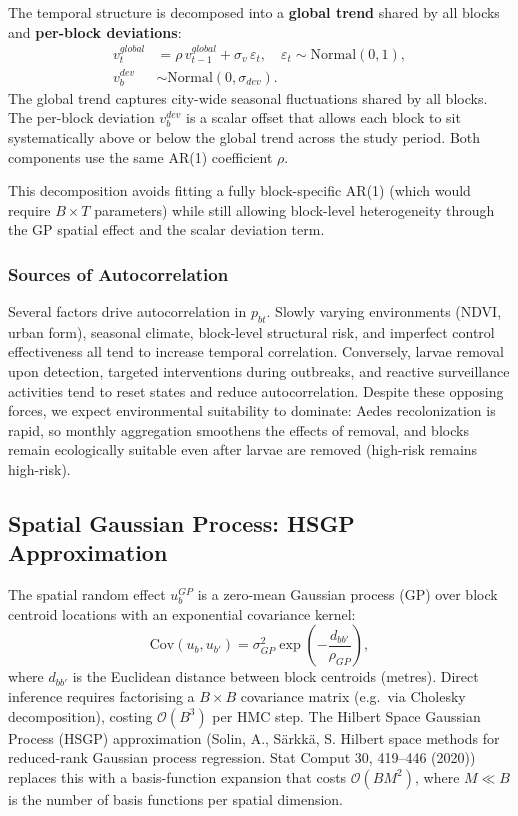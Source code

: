 \documentclass[12pt,a4paper]{article}
\begin{document}
The temporal structure is decomposed into a \textbf{global trend} shared by all blocks and \textbf{per-block deviations}:
\begin{align}
v_t^{global} &= \rho\, v_{t-1}^{global} + \sigma_v\, \varepsilon_t, \quad \varepsilon_t \sim \text{Normal}(0,1), \\
v_b^{dev} &\sim \text{Normal}(0, \sigma_{dev}).
\end{align}
The global trend captures city-wide seasonal fluctuations shared by all blocks. The per-block deviation $v_b^{dev}$ is a scalar offset that allows each block to sit systematically above or below the global trend across the study period. Both components use the same AR(1) coefficient $\rho$.

This decomposition avoids fitting a fully block-specific AR(1) (which would require $B \times T$ parameters) while still allowing block-level heterogeneity through the GP spatial effect and the scalar deviation term.

\subsubsection{Sources of Autocorrelation}

Several factors drive autocorrelation in $p_{bt}$. Slowly varying environments (NDVI, urban form), seasonal climate, block-level structural risk, and imperfect control effectiveness all tend to increase temporal correlation. Conversely, larvae removal upon detection, targeted interventions during outbreaks, and reactive surveillance activities tend to reset states and reduce autocorrelation. Despite these opposing forces, we expect environmental suitability to dominate: Aedes recolonization is rapid, so monthly aggregation smoothens the effects of removal, and blocks remain ecologically suitable even after larvae are removed (high-risk remains high-risk).

\subsection{Spatial Gaussian Process: HSGP Approximation}

The spatial random effect $u_b^{GP}$ is a zero-mean Gaussian process (GP) over block centroid locations with an exponential covariance kernel:
\begin{equation}
  \text{Cov}(u_b, u_{b'}) = \sigma_{GP}^2 \exp\!\left(-\frac{d_{bb'}}{\rho_{GP}}\right),
\end{equation}
where $d_{bb'}$ is the Euclidean distance between block centroids (metres). Direct inference requires factorising a $B \times B$ covariance matrix (e.g.\ via Cholesky decomposition), costing $\mathcal{O}(B^3)$ per HMC step. The Hilbert Space Gaussian Process (HSGP) approximation (Solin, A., Särkkä, S. Hilbert space methods for reduced-rank Gaussian process regression. Stat Comput 30, 419–446 (2020)) replaces this with a basis-function expansion that costs $\mathcal{O}(BM^2)$, where $M \ll B$ is the number of basis functions per spatial dimension.
\end{document}

